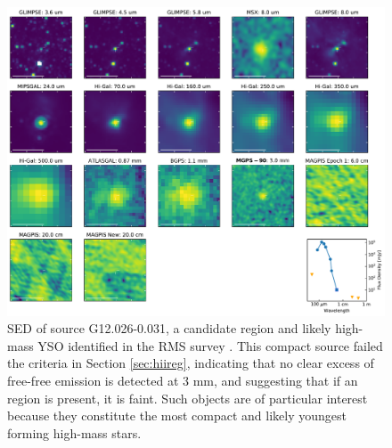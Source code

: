 \documentclass[twocolumn]{aastex62}
\begin{document}
\begin{figure}[htp]
\includegraphics[width=17cm]{figures/SED_plot_G12_G12.026-0.031.pdf}
\caption{SED of source G12.026-0.031, a candidate \hchii region and likely
high-mass YSO identified in the RMS survey \citep{Lumsden2013a}.  This compact
source failed the criteria in Section \ref{sec:hiireg}, indicating that no
clear excess of free-free emission is detected at 3 mm, and suggesting that if
an \hchii region is present, it is faint.  Such objects are of particular
interest because they constitute the most compact and likely youngest
forming high-mass stars.}
\label{fig:g12hiicand}
\end{figure}
\end{document}
